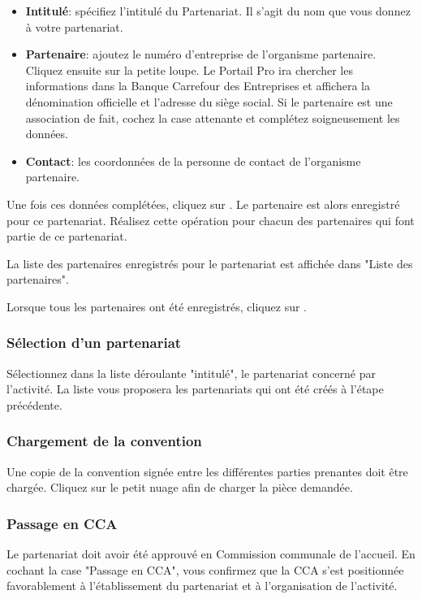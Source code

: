 \begin{itemize}
    \item \textbf{Intitulé}: spécifiez l'intitulé du Partenariat. Il s'agit du nom que vous donnez à votre partenariat.
    \item \textbf{Partenaire}: ajoutez le numéro d'entreprise de l'organisme partenaire. Cliquez ensuite sur la petite loupe. Le Portail Pro ira chercher les informations dans la Banque Carrefour des Entreprises et affichera la dénomination officielle et l'adresse du siège social. Si le partenaire est une association de fait, cochez la case attenante et complétez soigneusement les données.
    \item \textbf{Contact}: les coordonnées de la personne de contact de l'organisme partenaire. 
\end{itemize}


Une fois ces données complétées, cliquez sur . Le partenaire est alors enregistré pour ce partenariat. Réalisez cette opération pour chacun des partenaires qui font partie de ce partenariat.

La liste des partenaires enregistrés pour le partenariat est affichée dans "Liste des partenaires". 

Lorsque tous les partenaires ont été enregistrés, cliquez sur .


\subsubsection{Sélection d'un partenariat}
Sélectionnez dans la liste déroulante "intitulé", le partenariat concerné par l'activité. La liste vous proposera les partenariats qui ont été créés à l'étape précédente.

\subsubsection{Chargement de la convention}
Une copie de la convention signée entre les différentes parties prenantes doit être chargée. Cliquez sur le petit nuage afin de charger la pièce demandée.



\subsubsection{Passage en CCA}
Le partenariat doit avoir été approuvé en Commission communale de l'accueil. En cochant la case "Passage en CCA", vous confirmez que la CCA s'est positionnée favorablement à l'établissement du partenariat et à l'organisation de l'activité. 

